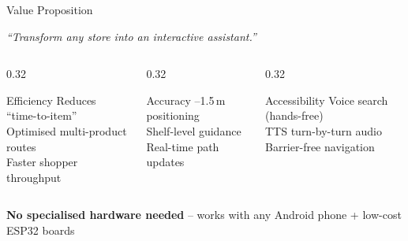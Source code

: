 \documentclass[aspectratio=169,12pt]{beamer}
\begin{document}
\begin{frame}{Value Proposition}
\begin{center}
\Large\textit{``Transform any store into an interactive assistant.''}
\end{center}
\vspace{0.5em}
\begin{columns}[T]
\begin{column}{0.32\textwidth}
\begin{block}{\centering Efficiency}
\centering
Reduces ``time-to-item''\\
Optimised multi-product routes\\
Faster shopper throughput
\end{block}
\end{column}
\begin{column}{0.32\textwidth}
\begin{block}{\centering Accuracy}
--1.5\,m positioning\\
Shelf-level guidance\\
Real-time path updates
\end{block}
\end{column}
\begin{column}{0.32\textwidth}
\begin{block}{\centering Accessibility}
\centering
Voice search (hands-free)\\
TTS turn-by-turn audio\\
Barrier-free navigation
\end{block}
\end{column}
\end{columns}
\vspace{1em}
\begin{center}
\textbf{No specialised hardware needed} -- works with any Android phone + low-cost ESP32 boards
\end{center}
\end{frame}
\end{document}
